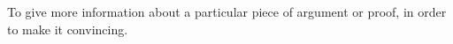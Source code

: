 To give more information about a particular piece of argument or
proof, in order to make it convincing.
